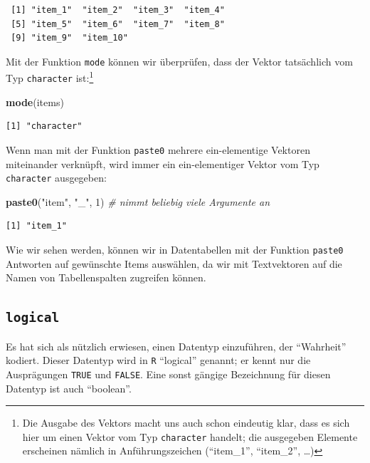 \documentclass[12pt,]{tufte-book}
\newenvironment{Shaded}{\begin{snugshade}}{\end{snugshade}}
\newcommand{\KeywordTok}[1]{\textcolor[rgb]{0.13,0.29,0.53}{\textbf{#1}}}
\newcommand{\DecValTok}[1]{\textcolor[rgb]{0.00,0.00,0.81}{#1}}
\newcommand{\StringTok}[1]{\textcolor[rgb]{0.31,0.60,0.02}{#1}}
\newcommand{\CommentTok}[1]{\textcolor[rgb]{0.56,0.35,0.01}{\textit{#1}}}
\newcommand{\NormalTok}[1]{#1}
\theoremstyle{definition}
\theoremstyle{definition}
\theoremstyle{definition}
\theoremstyle{remark}
\begin{document}
\begin{verbatim}
 [1] "item_1"  "item_2"  "item_3"  "item_4" 
 [5] "item_5"  "item_6"  "item_7"  "item_8" 
 [9] "item_9"  "item_10"
\end{verbatim}

Mit der Funktion \texttt{mode} können wir überprüfen, dass der Vektor
tatsächlich vom Typ \texttt{character} ist:\footnote{Die Ausgabe des
  Vektors macht uns auch schon eindeutig klar, dass es sich hier um
  einen Vektor vom Typ \texttt{character} handelt; die ausgegeben
  Elemente erscheinen nämlich in Anführungszeichen (``item\_1'',
  ``item\_2'', \ldots{})}

\begin{Shaded}
\begin{Highlighting}[]
\KeywordTok{mode}\NormalTok{(items)}
\end{Highlighting}
\end{Shaded}

\begin{verbatim}
[1] "character"
\end{verbatim}

Wenn man mit der Funktion \texttt{paste0} mehrere ein-elementige
Vektoren miteinander verknüpft, wird immer ein ein-elementiger Vektor
vom Typ \texttt{character} ausgegeben:

\begin{Shaded}
\begin{Highlighting}[]
\KeywordTok{paste0}\NormalTok{(}\StringTok{"item"}\NormalTok{, }\StringTok{"_"}\NormalTok{, }\DecValTok{1}\NormalTok{)  }\CommentTok{# nimmt beliebig viele Argumente an}
\end{Highlighting}
\end{Shaded}

\begin{verbatim}
[1] "item_1"
\end{verbatim}

Wie wir sehen werden, können wir in Datentabellen mit der Funktion
\texttt{paste0} Antworten auf gewünschte Items auswählen, da wir mit
Textvektoren auf die Namen von Tabellenspalten zugreifen können.

\subsection{\texorpdfstring{\texttt{logical}}{logical}}\label{logical}

Es hat sich als nützlich erwiesen, einen Datentyp einzuführen, der
``Wahrheit'' kodiert. Dieser Datentyp wird in \texttt{R} ``logical''
genannt; er kennt nur die Ausprägungen \texttt{TRUE} und \texttt{FALSE}.
Eine sonst gängige Bezeichnung für diesen Datentyp ist auch ``boolean''.
\end{document}
